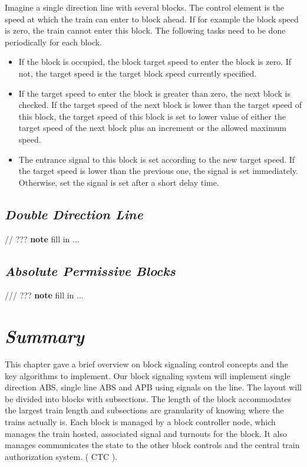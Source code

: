 Imagine a single direction line with several blocks. The control element is the speed at which the train can enter to block ahead. If for example the block speed is zero, the train cannot enter this block. The following tasks need to be done periodically for each block.
\begin{itemize}
\item If the block is occupied, the block target speed to enter the block is zero. If not, the target speed is the target block speed currently specified.
\item If the target speed to enter the block is greater than zero, the next block is checked. If the target speed of the next block is lower than the target speed of this block, the target speed of this block is set to lower value of either the target speed of the next block plus an increment or the allowed maximum speed.
\item The entrance signal to this block is set according to the new target speed. If the target speed is lower than the previous one, the signal is set immediately. Otherwise, set the signal is set after a short delay time.
\end{itemize}

\subsection{\textit{Double Direction Line}}

// ??? \textbf{note} fill in ...

\subsection{\textit{Absolute Permissive Blocks}}

/// ??? \textbf{note} fill in ...

\section{\textit{Summary}}

This chapter gave a brief overview on block signaling control concepts and the key algorithms to implement. Our block signaling system will implement single direction ABS, single line ABS and APB using signals on the line. The layout will be divided into blocks with subsections. The length of the block accommodates the largest train length and subsections are granularity of knowing where the trains actually is. Each block is managed by a block controller node, which manages the train hosted, associated signal and turnouts for the block. It also manages communicates the state to the other block controls and the central train authorization system. ( CTC ).

